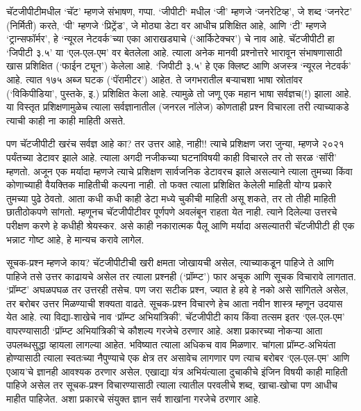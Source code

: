 चॅटजीपीटीमधील `चॅट' म्हणजे संभाषण, गप्पा. `जीपीटी` मधील `जी' म्हणजे `जनरेटिव्ह', जे शब्द `जनरेट' (निर्मिती) करते, `पी' म्हणजे `प्रिट्रेंड', जे मोठ्या डेटा वर आधीच प्रशिक्षित आहे, आणि `टी' म्हणजे `ट्रान्सफॉर्मर', हे `न्यूरल नेटवर्क'च्या एका आराखड्याचे (`आर्किटेक्चर') चे नाव आहे. चॅटजीपीटी हा `जिपीटी ३.५' या `एल-एल-एम' वर बेतलेला आहे. त्याला अनेक मानवी प्रश्नोत्तरे भारावून संभाषणासाठी खास प्रशिक्षित (`फाईन ट्यून') केलेला आहे. `जिपीटी ३.५' हे एक क्लिष्ट आणि अजस्त्र `न्यूरल नेटवर्क' आहे. त्यात १७५ अब्ज घटक (`पॅरामीटर') आहेत. ते जगभरातील बऱ्याचशा भाषा स्रोतांवर (`विकिपीडिया', पुस्तके, इ.) प्रशिक्षित केला आहे. त्यामुळे तो जणू एक महान भाषा सर्वज्ञच(!) झाला आहे. या विस्तृत प्रशिक्षणामुळेच त्याला सर्वज्ञानातील (जनरल नॉलेज) कोणताही प्रश्न विचारला तरी त्याच्याकडे त्याची काही ना काही माहिती असते.

पण चॅटजीपीटी खरंच सर्वज्ञ आहे का? तर उत्तर आहे, नाही!! त्याचे प्रशिक्षण जरा जुन्या, म्हणजे २०२१ पर्यंतच्या डेटावर झाले आहे. त्याला अगदी नजीकच्या घटनांविषयी काही विचारले तर तो सरळ `सॉरी' म्हणतो. अजून एक मर्यादा म्हणजे त्याचे प्रशिक्षण सार्वजनिक डेटावरच झाले असल्याने त्याला तुमच्या किंवा कोणाच्याही वैयक्तिक माहितीची कल्पना नाही. तो फक्त त्याला प्रशिक्षित केलेली माहिती योग्य प्रकारे तुमच्या पुढे ठेवतो. आता कधी कधी काही डेटा मध्ये चुकीची माहिती असू शकते, तर तो तीही माहिती छातीठोकपणे सांगतो. म्हणूनच चॅटजीपीटीवर पूर्णपणे अवलंबून राहता येत नाही. त्याने दिलेल्या उत्तरचे परीक्षण करणे हे कधीही श्रेयस्कर. असे काही नकारात्मक पैलू आणि मर्यादा असल्यातरी चॅटजीपीटी ही एक भन्नाट गोष्ट आहे, हे मान्यच करावे लागेल.

सूचक-प्रश्न म्हणजे काय?
चॅटजीपीटीची खरी क्षमता जोखायची असेल, त्याच्याकडून पाहिजे ते आणि पाहिजे तसे उत्तर काढायचे असेल तर त्याला प्रश्नही (`प्रॉम्प्ट') फार अचूक आणि सूचक विचारावे लागतात. `प्रॉम्प्ट' अघळपघळ तर उत्तरही तसेच. पण जरा सटीक प्रश्न, ज्यात हे हवे हे नको असे सांगितले असेल, तर बरोबर उत्तर मिळण्याची शक्यता वाढते. सूचक-प्रश्न विचारणे हेच आता नवीन शास्त्र म्हणून उदयास येत आहे. त्या विद्या-शाखेचे नाव `प्रॉम्प्ट अभियांत्रिकी'. चॅटजीपीटी काय किंवा तत्सम इतर `एल-एल-एम' वापरण्यासाठी `प्रॉम्प्ट अभियांत्रिकी'चे कौशल्य गरजेचे ठरणार आहे. अशा प्रकारच्या नोकऱ्या आता उपलब्धसुद्धा व्हायला लागल्या आहेत. भविष्यात त्याला अधिकच वाव मिळणार. चांगला प्रॉम्प्ट-अभियंता होण्यासाठी त्याला स्वतःच्या नैपुण्याचे एक क्षेत्र तर असावेच लागणार पण त्याच बरोबर `एल-एल-एम' आणि एआय'चे ज्ञानही आवश्यक ठरणार असेल. एखाद्या यंत्र अभियंत्याला दुचाकीचे इंजिन विषयी काही माहिती पाहिजे असेल तर सूचक-प्रश्न विचारण्यासाठी त्याला त्यातील परवलीचे शब्द, खाचा-खोचा पण आधीच माहीत पाहिजेत. अशा प्रकारचे संयुक्त ज्ञान सर्व शाखांना गरजेचे ठरणार आहे.

